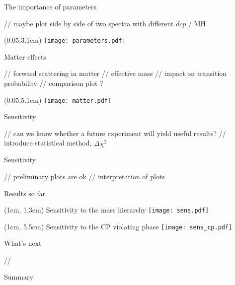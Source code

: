 \documentclass{beamer}
\begin{document}
\begin{frame}{The importance of parameters}

	// maybe plot side by side of two spectra with different $d cp$ / MH
	\begin{textblock*}{0.5\textwidth}(0.05\textwidth,3.1cm)
		\texttt{[image: parameters.pdf]}
	\end{textblock*}

\end{frame}


\begin{frame}{Matter effects}

	// forward scattering in matter
	// effective mass
	// impact on transition probability
	// comparison plot ?
	\begin{textblock*}{0.65\textwidth}(0.05\textwidth,5.1cm)
		\texttt{[image: matter.pdf]}
	\end{textblock*}

\end{frame}


\begin{frame}{Sensitivity}

	// can we know whether a future experiment will yield useful results?
	// introduce statistical method, $\overline{\Delta \chi^2}$

\end{frame}


\begin{frame}{Sensitivity}

	// preliminary plots are ok
	// interpretation of plots

\end{frame}


\begin{frame}{Results so far}

	\begin{textblock*}{\textwidth}(1cm, 1.3cm)
		Sensitivity to the mass hierarchy\vspace{-0.25cm}
	\texttt{[image: sens.pdf]}
	\end{textblock*}
	\begin{textblock*}{\textwidth}(1cm, 5.5cm)
		Sensitivity to the CP violating phase\vspace{-0.25cm}
	\texttt{[image: sens\_cp.pdf]}
	\end{textblock*}

\end{frame}


\begin{frame}{What's next}

	// 

\end{frame}


\begin{frame}{Summary}

\end{frame}
\end{document}
